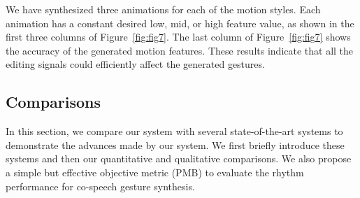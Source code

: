 \documentclass[acmtog,authorversion]{acmart}
\newcommand{\fig}{Figure{}~}
\begin{document}
We have synthesized three animations for each of the motion styles. Each animation has a constant desired low, mid, or high feature value, as shown in the first three columns of \fig\ref{fig:fig7}. The last column of \fig\ref{fig:fig7} shows the accuracy of the generated motion features. These results indicate that all the editing signals could efficiently affect the generated gestures.

\subsection{Comparisons}
\label{sbusec:comparisons}
In this section, we compare our system with several state-of-the-art systems to demonstrate the advances made by our system. We first briefly introduce these systems and then our quantitative and qualitative comparisons. We also propose a simple but effective objective metric (PMB) to evaluate the rhythm performance for co-speech gesture synthesis.
\end{document}
